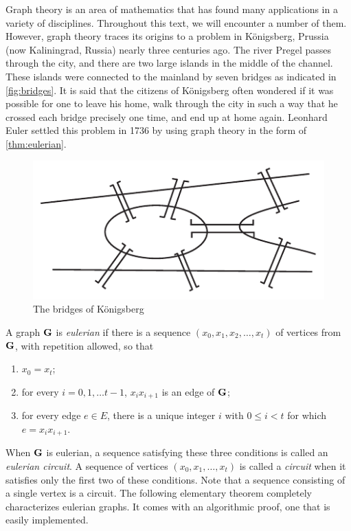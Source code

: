 Graph theory is an area of mathematics that has found many
applications in a variety of disciplines. Throughout this text, we
will encounter a number of them. However, graph theory traces its
origins to a problem in K\"onigsberg, Prussia (now Kaliningrad,
Russia) nearly three centuries ago. The river Pregel passes through
the city, and there are two large islands in the middle of the
channel. These islands were connected to the mainland by seven bridges
as indicated in \autoref{fig:bridges}. It is said that the citizens of
K\"onigsberg often wondered if it was possible for one to leave his
home, walk through the city in such a way that he crossed each bridge
precisely one time, and end up at home again. Leonhard Euler settled
this problem in 1736 by using graph theory in the form of
\autoref{thm:eulerian}.

\begin{figure}
  \centering
  \includegraphics{graphs-figs/konigsberg_bridges}
  \caption{\label{fig:bridges}The bridges of K\"onigsberg}
\end{figure}

A graph $\mathbf{G}$ is \textit{eulerian} if there is a sequence
$(x_0,x_1,x_2,\dots,x_t)$ of vertices from $\mathbf{G}$, with repetition
allowed, so that
\begin{enumerate}
\label{def:eulerian-circuit}
\item $x_0=x_t$;
\item for every $i=0,1,\dots t-1$, $x_ix_{i+1}$ is an edge of $\mathbf{G}$;
\item for every edge $e\in E$, there is a unique
  integer $i$ with $0\le i<t$ for which $e=x_ix_{i+1}$.
\end{enumerate}
When $\mathbf{G}$ is eulerian, a sequence satisfying these three conditions
is called an \textit{eulerian circuit}. A sequence of vertices
$(x_0,x_1,\dots,x_t)$ is called a \textit{circuit} when it satisfies
only the first two of these conditions.  Note that a sequence
consisting of a single vertex is a circuit. The following elementary
theorem completely characterizes eulerian graphs.  It comes with an
algorithmic proof, one that is easily implemented.

